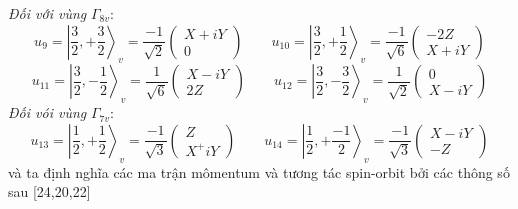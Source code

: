 \emph{Đối với vùng} $\Gamma_{8v}$:
\[
u_9 = \left | \frac{3}{2},+\frac{3}{2}\right\rangle_{v}=\frac{-1}{\sqrt{2}}\left(
\begin{array}{cc}
X + iY\\
0
\end{array}
\right)
\qquad
u_{10}= \left | \frac{3}{2},+\frac{1}{2}\right\rangle_{v}=\frac{-1}{\sqrt{6}}\left(
\begin{array}{cc}
-2Z\\
X + iY
\end{array}
\right)
\]
\[
u_{11} = \left | \frac{3}{2},-\frac{1}{2}\right\rangle_{v}=\frac{1}{\sqrt{6}}\left(
\begin{array}{cc}
X - iY\\
2Z
\end{array}
\right)
\qquad
u_{12} = \left | \frac{3}{2},-\frac{3}{2}\right\rangle_{v}=\frac{1}{\sqrt{2}}\left(
\begin{array}{cc}
0 \\
X - iY
\end{array}
\right)
\]
\emph{ Đối vói vùng} $\Gamma_{7v}$:
\[
u_{13} = \left | \frac{1}{2},+\frac{1}{2}\right\rangle_{v}=\frac{-1}{\sqrt{3}}\left(
\begin{array}{cc}
Z\\
X^ + iY
\end{array}
\right)
\qquad
u_{14}= \left | \frac{1}{2},+\frac{-1}{2}\right\rangle_{v}=\frac{-1}{\sqrt{3}}\left(
\begin{array}{cc}
X - iY\\
-Z
\end{array}
\right)
\]
và ta định nghĩa các ma trận mômentum và tương tác spin-orbit bởi các thông số sau [24,20,22]
